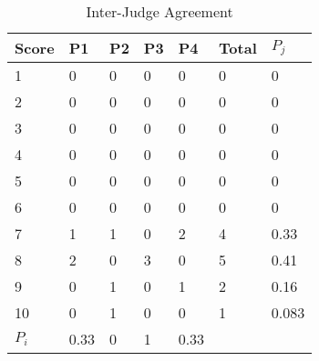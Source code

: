 \begin{table}
\begin{center}
\caption{Inter-Judge Agreement}
\begin{tabular}{| l || l | l | l | l || l | l |}
\hline
Score & P1 & P2 & P3 & P4 & Total & $P_j$\\ \hline
1 & 0 & 0 & 0 & 0 & 0 & 0 \\ 
2 & 0 & 0 & 0 & 0 & 0 & 0 \\
3 & 0 & 0 & 0 & 0 & 0 & 0 \\
4 & 0 & 0 & 0 & 0 & 0 & 0 \\
5 & 0 & 0 & 0 & 0 & 0 & 0 \\
6 & 0 & 0 & 0 & 0 & 0 & 0 \\
7 & 1 & 1 & 0 & 2 & 4 & 0.33 \\
8 & 2 & 0 & 3 & 0 & 5 & 0.41 \\
9 & 0 & 1 & 0 & 1 & 2 & 0.16 \\
10 & 0 & 1 & 0 & 0 & 1 & 0.083 \\ \hline
$P_i$ & 0.33 & 0 & 1 & 0.33 &  &  \\ \hline
\end{tabular}
\label{tbl1:kappa}
\end{center}
\end{table}	

